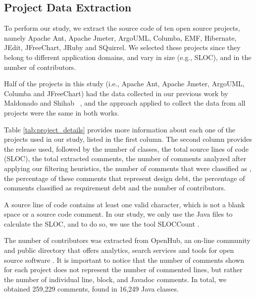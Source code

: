 \subsection{Project Data Extraction} %
\label{sub:data_extraction}

To perform our study, we extract the source code of ten open source projects, namely Apache Ant, Apache Jmeter, ArgoUML, Columba, EMF, Hibernate, JEdit, JFreeChart, JRuby and SQuirrel. We selected these projects since they belong to different application domains, and vary in size (e.g., SLOC), and in the number of contributors. 

Half of the projects in this study (i.e., Apache Ant, Apache Jmeter, ArgoUML, Columba and JFreeChart) had the data collected in our previous work by Maldonado and Shihab ~\cite{Maldonado2015MTD}, and the approach applied to collect the data from all projects were the same in both works. 

Table \ref{tab:project_details} provides more information about each one of the projects used in our study, listed in the first column. The second column provides the release used, followed by the number of classes, the total source lines of code (SLOC), the total extracted comments, the number of comments analyzed after applying our filtering heuristics, the number of comments that were classified as \SATD, the percentage of these comments that represent design debt, the percentage of \SATD comments classified as requirement debt and the number of contributors. 

A source line of code contains at least one valid character, which is not a blank space or a source code comment. In our study, we only use the Java files to calculate the SLOC, and to do so, we use the tool SLOCCount \cite{wheeler2004:home}. 

The number of contributors was extracted from OpenHub, an on-line community and public directory that offers analytics, search services and tools for open source software \cite{Openhub:home}. It is important to notice that the number of comments shown for each project does not represent the number of commented lines, but rather the number of individual line, block, and Javadoc comments. In total, we obtained 259,229 comments, found in 16,249 Java classes.

